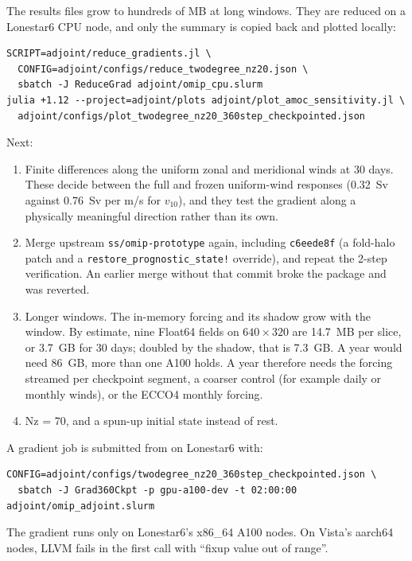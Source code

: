 \documentclass[11pt]{article}
\begin{document}
The results files grow to hundreds of MB at long windows. They are reduced on a Lonestar6 CPU node, and
only the summary is copied back and plotted locally:
\begin{verbatim}
SCRIPT=adjoint/reduce_gradients.jl \
  CONFIG=adjoint/configs/reduce_twodegree_nz20.json \
  sbatch -J ReduceGrad adjoint/omip_cpu.slurm
julia +1.12 --project=adjoint/plots adjoint/plot_amoc_sensitivity.jl \
  adjoint/configs/plot_twodegree_nz20_360step_checkpointed.json
\end{verbatim}
Next:
\begin{enumerate}
\item Finite differences along the uniform zonal and meridional winds at 30 days. These decide between the
      full and frozen uniform-wind responses (\SI{+0.32}{Sv} against \SI{+0.76}{Sv} per m/s for $v_{10}$),
      and they test the gradient along a physically meaningful direction rather than its own.
\item Merge upstream \texttt{ss/omip-prototype} again, including \texttt{c6eede8f} (a fold-halo patch
      and a \texttt{restore\_prognostic\_state!} override), and repeat the 2-step verification. An
      earlier merge without that commit broke the package and was reverted.
\item Longer windows. The in-memory forcing and its shadow grow with the window. By estimate, nine
      Float64 fields on $640\times320$ are \SI{14.7}{MB} per slice, or \SI{3.7}{GB} for 30 days; doubled
      by the shadow, that is \SI{7.3}{GB}. A year would need \SI{86}{GB}, more than one A100 holds. A year
      therefore needs the forcing streamed per checkpoint segment, a coarser control (for example daily
      or monthly winds), or the ECCO4 monthly forcing.
\item Nz = 70, and a spun-up initial state instead of rest.
\end{enumerate}

A gradient job is submitted from  on Lonestar6 with:
\begin{verbatim}
CONFIG=adjoint/configs/twodegree_nz20_360step_checkpointed.json \
  sbatch -J Grad360Ckpt -p gpu-a100-dev -t 02:00:00 adjoint/omip_adjoint.slurm
\end{verbatim}
The gradient runs only on Lonestar6's x86\_64 A100 nodes. On Vista's aarch64 nodes, LLVM fails in the
first call with ``fixup value out of range''.
\end{document}

